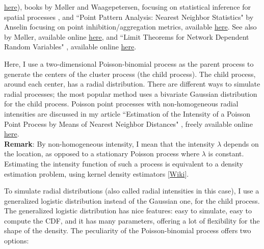 \documentclass[10pt]{article}
\begin{document}
\href{https://drive.google.com/file/d/1l5VI7gvS2TKUC11VrkOpph4ITZ8GIO81/view?usp=sharing}{here}),  books by Møller and Waagepetersen, focusing on statistical inference for spatial processes \cite{momo66,momo67}, and ``Point Pattern Analysis: Nearest Neighbor Statistics" by Anselin \cite{anselin} focusing on point inhibition/aggregation metrics, available
\href{https://spatial.uchicago.edu/sites/spatial.uchicago.edu/files/9_points_2_r.pdf}{here}. See
also \cite{momo55} by Møller, available online \href{https://cimpatogo2018.sciencesconf.org/data/pages/Handout_Moller_CIMPA_Togo_2018.pdf}{here}, and ``Limit Theorems for Network Dependent Random Variables" \cite{econo6}, available online \href{https://arxiv.org/abs/1903.01059}{here}.


Here, I use a two-dimensional Poisson-binomial process as the parent process to generate the centers of the cluster process (the child process). The child process, around each center, has a
\textcolor{index}{radial distribution}. There are different ways to simulate \textcolor{index}{radial processes}; the most popular method uses a bivariate Gaussian distribution for the child process. Poisson point processes with \textcolor{index}{non-homogeneous} radial intensities are discussed in my article ``Estimation of the Intensity of a Poisson Point Process by Means of Nearest Neighbor Distances" \cite{vgstat}, freely available online
\href{https://www.researchgate.net/publication/230268902_Estimation_of_the_intensity_of_a_Poisson_point_process_by_means_of_nearest_neighbor_distances}{here}. \vspace{1ex} \\
{\bf Remark}: By non-homogeneous intensity, I mean that the intensity $\lambda$ depends on the location, as opposed to a stationary Poisson process where $\lambda$ is constant. Estimating the \textcolor{index}{intensity function} of such a process is equivalent to a \textcolor{index}{density estimation} problem,
using kernel density estimators [\href{https://en.wikipedia.org/wiki/Kernel_density_estimation}{Wiki}].

To simulate radial distributions (also called radial intensities in this case), I use a generalized logistic distribution instead of the Gaussian one, for the child process. The generalized logistic distribution has nice features: easy to simulate, easy to compute the CDF, and it has many parameters, offering a lot of flexibility for the shape of the density. The peculiarity of the Poisson-binomial process offers two options:
\end{document}

